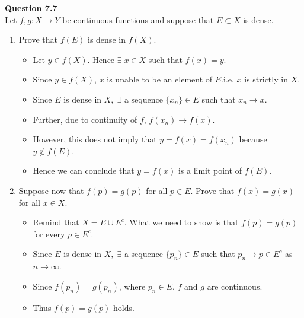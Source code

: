 \documentclass[12pt]{article}
\begin{document}
\vspace{1.5\baselineskip}
\textbf{Question 7.7}\\
Let $f,g: X\rightarrow Y$ be continuous functions and suppose that $E\subset X$ is dense. 
\begin{enumerate}[label=(\roman*)]
    \item Prove that $f(E)$ is dense in $f(X)$. 
    \begin{itemize}
        \item Let $y\in f(X)$. Hence $\exists\; x\in X$ such that $f(x)=y$.
        \item Since $y\in f(X)$, $x$ is unable to be an element of $E$.\hfill i.e. $x$ is strictly in $X$.
        \item Since $E$ is dense in $X,\; \exists$ a sequence $\{x_n\}\in E$ such that $x_n\to x$.
        \item Further, due to continuity of $f$, $f(x_n)\to f(x)$.
        \item However, this does not imply that $y=f(x)=f(x_n)$ because $y\notin f(E)$.
        \item Hence we can conclude that $y=f(x)$ is a limit point of $f(E)$.
    \end{itemize}
    
    \item Suppose now that $f(p) = g(p)$ for all $p\in E$. Prove that $f(x)=g(x)$ for all $x\in X$.
    \begin{itemize}
        \item Remind that $X=E\cup E^c$. What we need to show is that $f(p)=g(p)$ for every $p\in E^c$.
        \item Since $E$ is dense in $X,\;\exists$ a sequence $\{p_n\}\in E$ such that $p_n \to p\in E^c$ as $n\to \infty$. 
        \item Since $f(p_n)=g(p_n)$, where $p_n\in E$, $f$ and $g$ are continuous.
        \item Thus $f(p)=g(p)$ holds.
    \end{itemize}
\end{enumerate}
\end{document}
